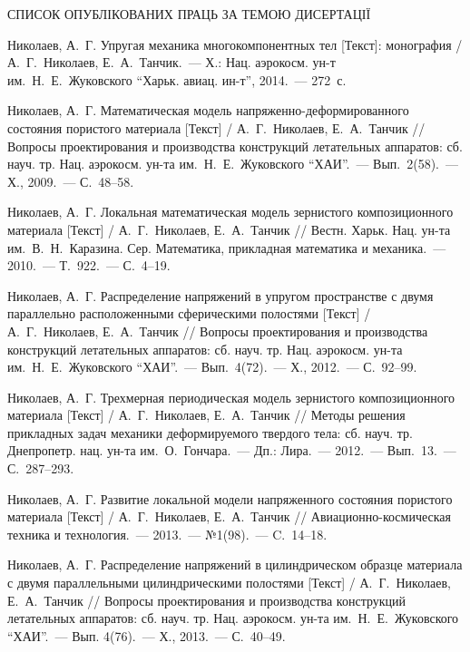 \documentclass[book,14pt,small,oneside]{ncc}
\begin{document}
\begin{center}
СПИСОК ОПУБЛІКОВАНИХ ПРАЦЬ ЗА ТЕМОЮ ДИСЕРТАЦІЇ
\end{center}

\begin{biblist}{99}\setlength\itemsep{-1.9pt}

Николаев, А.~Г.
Упругая механика многокомпонентных тел [Текст]: монография 
/ А.~Г.~Николаев, Е.~А.~Танчик.~--- Х.: Нац. аэрокосм. ун-т им.~Н.~Е.~Жуковского ``Харьк. авиац. ин-т'', 2014.~--- 272~с.

Николаев, А.~Г. 
Математическая модель напряженно-деформированного состояния пористого материала [Текст] 
/ А.~Г.~Николаев, Е.~А.~Танчик 
// Вопросы проектирования и производства конструкций летательных аппаратов: сб. науч. тр. Нац. аэрокосм. ун-та им.~Н.~Е.~Жуковского ``ХАИ''.~--- Вып.~2(58).~--- Х., 2009.~--- С.~48--58.

Николаев, А.~Г. 
Локальная математическая модель зернистого композиционного материала [Текст] 
/ А.~Г.~Николаев, Е.~А.~Танчик 
// Вестн. Харьк. Нац. ун-та им.~В.~Н.~Каразина. Сер. Математика, прикладная математика и механика.~--- 2010.~--- Т.~922.~--- С.~4--19.

Николаев, А.~Г. 
Распределение напряжений в упругом пространстве с двумя параллельно расположенными сферическими полостями [Текст] 
/ А.~Г.~Николаев, Е.~А.~Танчик 
// Вопросы проектирования и производства конструкций летательных аппаратов: сб. науч. тр. Нац. аэрокосм. ун-та им.~Н.~Е.~Жуковского ``ХАИ''.~--- Вып.~4(72).~--- Х., 2012.~--- С.~92--99.

Николаев, А.~Г. 
Трехмерная периодическая модель зернистого композиционного материала [Текст] 
/ А.~Г.~Николаев, Е.~А.~Танчик 
// Методы решения прикладных задач механики деформируемого твердого тела: сб. науч. тр. Днепропетр. нац. ун-та им.~О.~Гончара.~--- Дп.: Лира.~--- 2012.~--- Вып.~13.~--- С.~287--293.

Николаев, А.~Г. 
Развитие локальной модели напряженного состояния пористого материала [Текст] 
/ А.~Г.~Николаев, Е.~А.~Танчик 
// Авиационно-космическая техника и технология.~--- 2013.~--- №1(98).~--- C.~14--18.

Николаев, А.~Г. 
Распределение напряжений в цилиндрическом образце материала с двумя параллельными цилиндрическими полостями [Текст] 
/ А.~Г.~Николаев, Е.~А.~Танчик 
// Вопросы проектирования и производства конструкций летательных аппаратов: сб. науч. тр. Нац. аэрокосм. ун-та им.~Н.~Е.~Жуковского ``ХАИ''.~--- Вып. 4(76).~--- Х., 2013.~--- С.~40--49.


\end{biblist}
\end{document}
